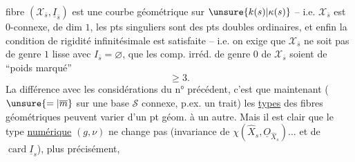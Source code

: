 fibre $(\mathcal X_{\bar s},\underline I_{\bar s})$ est une courbe géométrique sur $\unsure{k(s)|\kappa(s)}$ -- i.e. $\mathcal X_{\bar s}$ est $0$-connexe, de dim $1$,  les pts singuliers sont  des pts doubles ordinaires, et enfin la condition de rigidité infinitésimale  est satisfaite --  i.e. on exige que $\mathcal X_{\bar s}$ ne soit pas de genre $1$ lisse avec $I_{\bar s}=\varnothing$,  que les comp. irréd. de genre $0$ de $\mathcal X_{\bar s}$ soient de ``poids marqué''
\[
\geq 3.
\]
La différence avec les considérations du n° précédent, c'est que maintenant ($\unsure{=|\overline m}$ sur une base $\mathcal S$ connexe, p.ex.  un trait) les \uline{types} des fibres géométriques peuvent varier d'un pt géom. à un autre. Mais il est clair que le type \uline{numérique} $(g,\nu)$ ne change pas (invariance de $\chi(\widehat X_s,\underline O_{\widehat X_s})\ldots$ et de $\operatorname{card}\underline I_s$), plus précisément,
